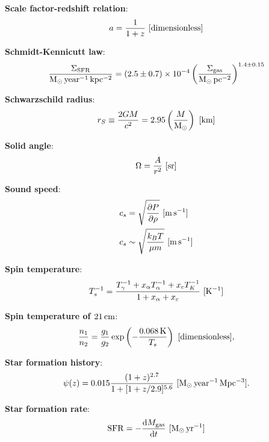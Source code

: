 \documentclass[a4paper,11pt]{article}
\begin{document}
{\noindent}\textbf{Scale factor-redshift relation}:
\begin{align*}
    a = \dfrac{1}{1+z} ~ [{\rm dimensionless}]
\end{align*}

{\noindent}\textbf{Schmidt-Kennicutt law}:
\begin{align*}
    \frac{\Sigma_\mathrm{SFR}}{{\rm M_\odot\,year^{-1}\,kpc^{-2}}} = (2.5\pm0.7)\times10^{-4} \left(\frac{\Sigma_\mathrm{gas}}{{\rm M_\odot\,pc^{-2}}}\right)^{1.4\pm0.15}
\end{align*}

{\noindent}\textbf{Schwarzschild radius}:
\begin{align*}
    r_S \equiv \frac{2GM}{c^2} = 2.95\left(\frac{M}{{\rm M_\odot}}\right) ~ [{\rm km}]
\end{align*}

{\noindent}\textbf{Solid angle}:
\begin{align*}
    \Omega = \frac{A}{r^2} ~ [{\rm sr}]
\end{align*}

{\noindent}\textbf{Sound speed}:
\begin{align*}
    c_s &= \sqrt{\frac{\partial P}{\partial\rho}} ~ [{\rm m\,s^{-1}}] \\
    c_s &\sim \sqrt{\frac{k_BT}{\mu m}} ~ [{\rm m\,s^{-1}}]
\end{align*}

{\noindent}\textbf{Spin temperature}:
\begin{align*}
    T_s^{-1} = \frac{T_\gamma^{-1} + x_\alpha T_\alpha^{-1} + x_cT_K^{-1}}{1+x_\alpha+x_c} ~ [{\rm K^{-1}}]
\end{align*}

{\noindent}\textbf{Spin temperature of $21\,{\rm cm}$}:
\begin{align*}
    \frac{n_1}{n_2} = \frac{g_1}{g_2}\exp\left(-\frac{0.068\,{\rm K}}{T_s}\right) ~ [{\rm dimensionless}],
\end{align*}

{\noindent}\textbf{Star formation history}:
\begin{align*}
    \psi(z) = 0.015\frac{(1+z)^{2.7}}{1+[1+z/2.9]^{5.6}} ~ [{\rm M_\odot\,year^{-1}\,Mpc^{-3}}].
\end{align*}

{\noindent}\textbf{Star formation rate}:
\begin{align*}
    \mathrm{SFR} = -\frac{\mathrm{d}M_\mathrm{gas}}{\mathrm{d}t} ~ [{\rm M_\odot\,yr^{-1}}]
\end{align*}
\end{document}
